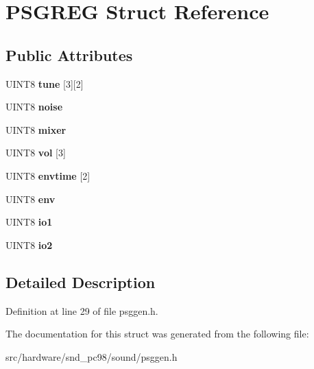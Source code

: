 \hypertarget{structPSGREG}{\section{P\-S\-G\-R\-E\-G Struct Reference}
\label{structPSGREG}
}
\subsection*{Public Attributes}
\begin{DoxyCompactItemize}
\item 
\hypertarget{structPSGREG_a51872225c6741efb96fb65222fd7881c}{U\-I\-N\-T8 {\bfseries tune} \mbox{[}3\mbox{]}\mbox{[}2\mbox{]}}\label{structPSGREG_a51872225c6741efb96fb65222fd7881c}

\item 
\hypertarget{structPSGREG_a74886b54206b64e6fc9b266aa925e479}{U\-I\-N\-T8 {\bfseries noise}}\label{structPSGREG_a74886b54206b64e6fc9b266aa925e479}

\item 
\hypertarget{structPSGREG_a7eae6c649f3ae79d06f894857c4a9e50}{U\-I\-N\-T8 {\bfseries mixer}}\label{structPSGREG_a7eae6c649f3ae79d06f894857c4a9e50}

\item 
\hypertarget{structPSGREG_abd4cfb01fbfdf4dc53e930a36d094c52}{U\-I\-N\-T8 {\bfseries vol} \mbox{[}3\mbox{]}}\label{structPSGREG_abd4cfb01fbfdf4dc53e930a36d094c52}

\item 
\hypertarget{structPSGREG_ab82c75a350893f30b2fc4671fb5ec5db}{U\-I\-N\-T8 {\bfseries envtime} \mbox{[}2\mbox{]}}\label{structPSGREG_ab82c75a350893f30b2fc4671fb5ec5db}

\item 
\hypertarget{structPSGREG_aa63ce1bc1e609c059775de0e50c6444d}{U\-I\-N\-T8 {\bfseries env}}\label{structPSGREG_aa63ce1bc1e609c059775de0e50c6444d}

\item 
\hypertarget{structPSGREG_a9bd68ff3026a98e46fb74943a4df322a}{U\-I\-N\-T8 {\bfseries io1}}\label{structPSGREG_a9bd68ff3026a98e46fb74943a4df322a}

\item 
\hypertarget{structPSGREG_afe65d57b321c67dc76b1635414d2556e}{U\-I\-N\-T8 {\bfseries io2}}\label{structPSGREG_afe65d57b321c67dc76b1635414d2556e}

\end{DoxyCompactItemize}


\subsection{Detailed Description}


Definition at line 29 of file psggen.\-h.



The documentation for this struct was generated from the following file\-:\begin{DoxyCompactItemize}
\item 
src/hardware/snd\-\_\-pc98/sound/psggen.\-h\end{DoxyCompactItemize}
